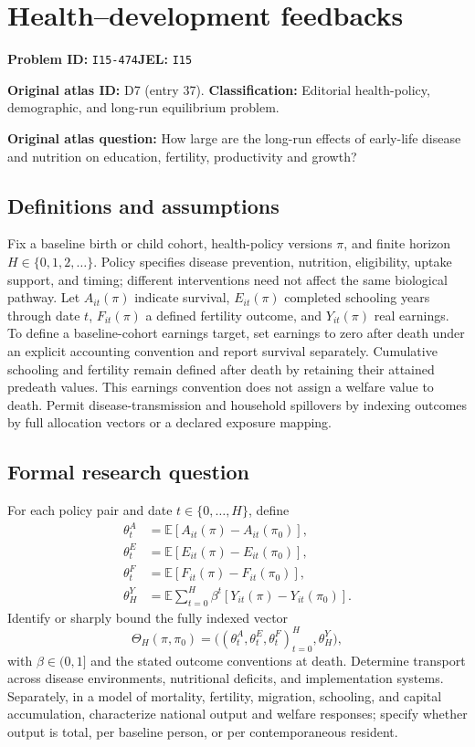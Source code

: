 \documentclass[11pt,a4paper]{article}
\begin{document}
\section*{Health–development feedbacks}
\textbf{Problem ID:} \texttt{I15-474}\quad \textbf{JEL:} \texttt{I15}\par
\label{problem:OP-0037}
\label{atlas:prob:D7}
\noindent\textbf{Original atlas ID:} D7 (entry 37). \textbf{Classification:} Editorial health-policy, demographic, and long-run equilibrium problem.

\noindent\textbf{Original atlas question:} How large are the long-run effects of early-life disease and nutrition on education, fertility, productivity and growth?

\subsection*{Definitions and assumptions}
Fix a baseline birth or child cohort, health-policy versions $\pi$, and finite horizon $H\in\{0,1,2,\ldots\}$. Policy specifies disease prevention, nutrition, eligibility, uptake support, and timing; different interventions need not affect the same biological pathway. Let $A_{it}(\pi)$ indicate survival, $E_{it}(\pi)$ completed schooling years through date $t$, $F_{it}(\pi)$ a defined fertility outcome, and $Y_{it}(\pi)$ real earnings. To define a baseline-cohort earnings target, set earnings to zero after death under an explicit accounting convention and report survival separately. Cumulative schooling and fertility remain defined after death by retaining their attained predeath values. This earnings convention does not assign a welfare value to death. Permit disease-transmission and household spillovers by indexing outcomes by full allocation vectors or a declared exposure mapping.
\subsection*{Formal research question}
For each policy pair and date $t\in\{0,\ldots,H\}$, define
\begin{align*}
 \theta^A_t&=\mathbb E[A_{it}(\pi)-A_{it}(\pi_0)],\\
 \theta^E_t&=\mathbb E[E_{it}(\pi)-E_{it}(\pi_0)],\\
 \theta^F_t&=\mathbb E[F_{it}(\pi)-F_{it}(\pi_0)],\\
 \theta^Y_H&=\mathbb E\sum_{t=0}^H\beta^t
                    [Y_{it}(\pi)-Y_{it}(\pi_0)].
\end{align*}
Identify or sharply bound the fully indexed vector
\[
 \Theta_H(\pi,\pi_0)
    =\bigl((\theta^A_t,\theta^E_t,\theta^F_t)_{t=0}^H,\theta^Y_H\bigr),
\]
with $\beta\in(0,1]$ and the stated outcome conventions at death. Determine transport across disease environments, nutritional deficits, and implementation systems. Separately, in a model of mortality, fertility, migration, schooling, and capital accumulation, characterize national output and welfare responses; specify whether output is total, per baseline person, or per contemporaneous resident.
\end{document}
